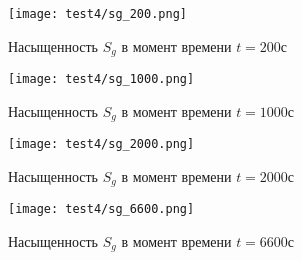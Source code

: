 \begin{figure}
  \begin{center}
    \begin{minipage}[h]{0.49\textwidth}
       \texttt{[image: test4/sg\_200.png]} 
       \caption{Насыщенность $S_g$ в момент времени $t=200$с}
    \end{minipage}
    \hfill
    \begin{minipage}[h]{0.49\textwidth}
       \texttt{[image: test4/sg\_1000.png]} 
       \caption{Насыщенность $S_g$ в момент времени $t=1000$с}
    \end{minipage}
    \vfill
    \begin{minipage}[h]{0.49\textwidth}
       \texttt{[image: test4/sg\_2000.png]} 
       \caption{Насыщенность $S_g$ в момент времени $t=2000$с}
    \end{minipage}
    \hfill
    \begin{minipage}[h]{0.49\textwidth}
       \texttt{[image: test4/sg\_6600.png]} 
       \caption{Насыщенность $S_g$ в момент времени $t=6600$с}
    \end{minipage}
    \hfill  
  \end{center}
\end{figure}








